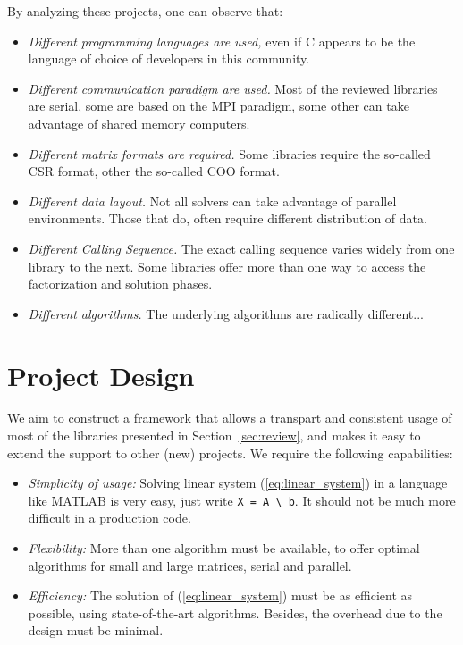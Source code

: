\documentclass[acmtocl]{acmtrans2m}
\begin{document}
By analyzing these projects, one can observe that:
\begin{itemize}
\item {\sl Different programming languages are used,}  even if C appears to be
  the language of choice of developers in this community.

\item {\sl Different communication paradigm are used.} 
 Most of the reviewed libraries are serial, some are based on the MPI
 paradigm, some other can take advantage of shared memory computers.

\item {\sl Different matrix formats are required.} Some libraries require the
so-called CSR format, other the so-called COO format. 

\item {\sl Different data layout.} Not all solvers can take advantage of
parallel environments. Those that do, often require different distribution of
data. 

\item {\sl Different Calling Sequence.} The exact calling sequence varies
widely from one library to the next.  Some libraries offer more than one way
to access the factorization and solution phases.

\item {\sl Different algorithms.} The underlying algorithms are radically
different...

\end{itemize}

\section{Project Design}
\label{sec:design}

We aim to construct a framework that allows a transpart and consistent usage
of most of the libraries presented in Section~\ref{sec:review}, and makes it easy
to extend the support to other (new) projects. We require the following capabilities:
\begin{itemize}

\item {\sl Simplicity of usage:} Solving linear system (\ref{eq:linear_system}) in a language
like MATLAB is very easy, just write \verb!X = A \ b!. It should not be much
more difficult in a production code.

\item {\sl Flexibility:} More than one algorithm must be available,
  to offer optimal algorithms for small and large matrices, serial and
  parallel.

\item {\sl Efficiency:} The solution of (\ref{eq:linear_system}) must be as
efficient as possible, using state-of-the-art algorithms. Besides, the
overhead due to the design must be minimal.
\end{itemize}
\end{document}
